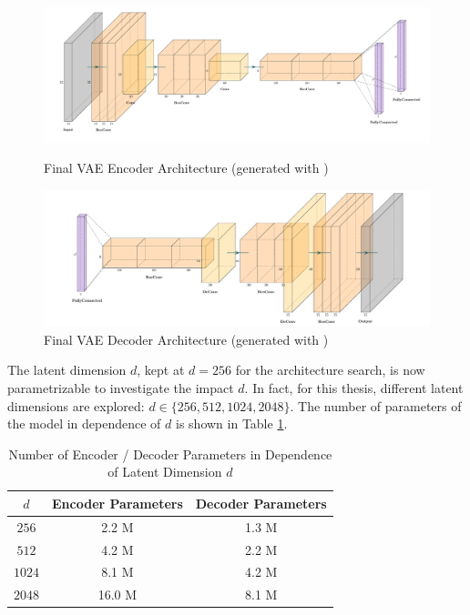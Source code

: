 \begin{figure}[htb]
    \centering
    \begin{minipage}[b]{\textwidth}
        \centering
        \includegraphics[width=\textwidth]{figures/model_architecture/build/final_vae_encoder.pdf}
        \caption{Final VAE Encoder Architecture (generated with \parencite{NNVisualization})}
        \label{fig:final_encoder}
    \end{minipage}
    \begin{minipage}[b]{\textwidth}
        \centering
        \includegraphics[width=\textwidth]{figures/model_architecture/build/final_vae_decoder.pdf}
        \caption{Final VAE Decoder Architecture (generated with \parencite{NNVisualization})}
        \label{fig:final_decoder}
    \end{minipage}
\end{figure}

The latent dimension $d$, kept at $d = 256$ for the architecture search, is now parametrizable to investigate the impact $d$.
In fact, for this thesis, different latent dimensions are explored: $d \in \{ 256, 512, 1024, 2048 \}$.
The number of parameters of the model in dependence of $d$ is shown in Table \ref{tab:num_parameters}.

\begin{table}[htb]
    \centering
    \begin{tabular}{|c|c|c|}
        \hline
        \textbf{$d$} & \textbf{Encoder Parameters} & \textbf{Decoder Parameters} \\
        \hline
        \hline
        $256$ & 2.2 M & 1.3 M \\
        $512$ & 4.2 M & 2.2 M \\
        $1024$ & 8.1 M & 4.2 M \\
        $2048$ & 16.0 M & 8.1 M \\
        \hline
    \end{tabular}
    \caption{Number of Encoder / Decoder Parameters in Dependence of Latent Dimension $d$}
    \label{tab:num_parameters}
\end{table}

